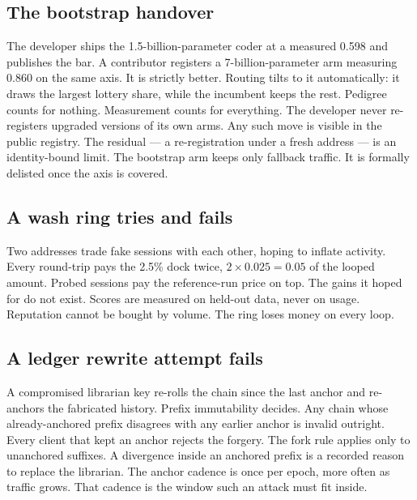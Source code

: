 \documentclass[11pt]{article}
\begin{document}
\subsection{The bootstrap handover}

The developer ships the 1.5-billion-parameter coder at a measured
0.598 and publishes the bar. A contributor registers a
7-billion-parameter arm measuring 0.860 on the same axis. It is
strictly better. Routing tilts to it automatically: it draws the
largest lottery share, while the incumbent keeps the rest.
Pedigree counts for nothing. Measurement counts for everything. The
developer never re-registers upgraded versions of its own arms.
Any such move is visible in the public registry. The residual ---
a re-registration under a fresh address --- is an identity-bound
limit. The bootstrap arm keeps only
fallback traffic. It is formally delisted once the axis is
covered.

\subsection{A wash ring tries and fails}

Two addresses trade fake sessions with each other, hoping to
inflate activity. Every round-trip pays the 2.5\% dock twice,
$2 \times 0.025 = 0.05$ of the looped amount. Probed sessions
pay the reference-run price on top. The gains it
hoped for do not exist. Scores are measured on held-out data,
never on usage. Reputation cannot be bought by volume. The ring
loses money on every loop.

\subsection{A ledger rewrite attempt fails}

A compromised librarian key re-rolls the chain since the last
anchor and re-anchors the fabricated history. Prefix immutability
decides. Any chain whose already-anchored prefix disagrees with
any earlier anchor is invalid outright. Every client that kept an
anchor rejects the forgery. The fork rule applies only to
unanchored suffixes. A divergence inside an anchored prefix is a
recorded reason to replace the librarian. The anchor cadence is
once per epoch, more often as traffic grows. That cadence is the
window such an attack must fit inside.
\end{document}
